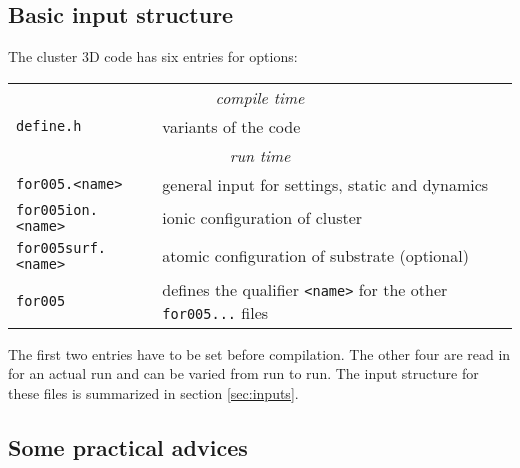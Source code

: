 \documentclass[12pt]{article}
\begin{document}
\subsection{Basic input structure}
The cluster 3D code has six entries for options:
\\[-28pt]
\begin{center}
\begin{tabular}{ll}
\hline
\multicolumn{2}{c}{\it compile time}\\
 {\tt define.h} & variants of the code\\
\hline
\multicolumn{2}{c}{\it run time}\\
 {\tt for005.<name>} & general input for settings, static and
 dynamics\\
 {\tt for005ion.<name>} & ionic configuration of cluster\\
 {\tt for005surf.<name>} & atomic configuration of substrate (optional)\\
 {\tt for005} & defines the qualifier {\tt <name>} for 
                the other {\tt for005...} files\\
\hline
\end{tabular}
\end{center}
The first two entries have to be set before compilation. The
other four are read in for an actual run and can be varied from
run to run. The input structure for these files is summarized
in section \ref{sec:inputs}.

\subsection{Some practical advices}
\end{document}
